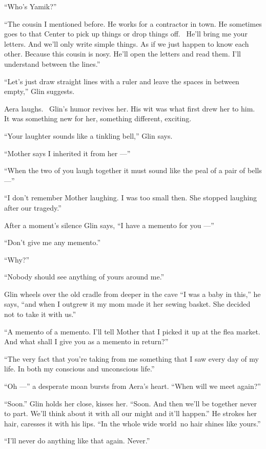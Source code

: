 \documentclass[twoside,11pt,openany]{book}
\begin{document}
``Who's Yamik?''

``The cousin I mentioned before. He works for a contractor in town. He sometimes goes to that Center to
pick up things or drop things off.~ He'll bring me your letters. And we'll only write simple things. As if we just
happen to know each other. Because this cousin is nosy. He'll open the letters and read them. I'll understand between
the lines.''

``Let's just draw straight lines with a ruler and leave the spaces in between empty,'' Glin
suggests.

Aera laughs. ~Glin's humor revives her. His wit was what first drew her to him. It was something new for her, something
different, exciting.

``Your laughter sounds like a tinkling bell,'' Glin says.

``Mother says I inherited it from her ---''

``When the two of you laugh together it must sound like the peal of a pair of bells ---''

``I don't remember Mother laughing. I was too small then. She stopped laughing after our
tragedy.''

After a moment's silence Glin says, ``I have a memento for you ---''

``Don't give me any memento.''

``Why?''

``Nobody should see anything of yours around me.''

Glin wheels over the old cradle from deeper in the cave ``I was a baby in this,'' he says,
``and when I outgrew it my mom made it her sewing basket. She decided not to take it with
us.''

``A memento of a memento. I'll tell Mother that I picked it up at the flea market. And what shall I give
you as a memento in return?''

``The very fact that you're taking from me something that I saw every day of my life. In both my conscious
and unconscious life.''

``Oh ---'' a desperate moan bursts from Aera's heart. ``When will we meet
again?''

``Soon.'' Glin holds her close, kisses her. ``Soon. And then we'll be together
never to part. We'll think about it with all our might and it'll happen.'' He strokes her hair, caresses
it with his lips. ``In the whole wide world~no hair shines like yours.''

``I'll never do anything like that again. Never.''
\end{document}
